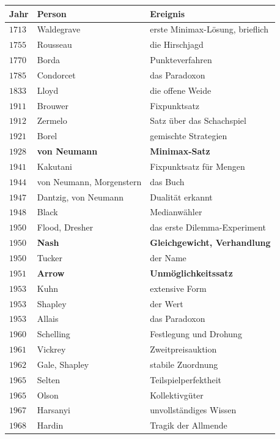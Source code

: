 \begin{merksatz}
\begin{center}
{\small
\renewcommand{\arraystretch}{1.34}
\begin{tabular}{@{}P{1.4cm}P{2.8cm}P{4.0cm}@{}}
\toprule
\textbf{Jahr} & \textbf{Person} & \textbf{Ereignis}\\
\midrule
$1713$ & Waldegrave & erste Minimax-Lösung, brieflich\\
$1755$ & Rousseau & die Hirschjagd\\
$1770$ & Borda & Punkteverfahren\\
$1785$ & Condorcet & das Paradoxon\\
$1833$ & Lloyd & die offene Weide\\
$1911$ & Brouwer & Fixpunktsatz\\
$1912$ & Zermelo & Satz über das Schachspiel\\
$1921$ & Borel & gemischte Strategien\\
$1928$ & \textbf{von Neumann} & \textbf{Minimax-Satz}\\
$1941$ & Kakutani & Fixpunktsatz für Mengen\\
$1944$ & von Neumann, Morgenstern & das Buch\\
$1947$ & Dantzig, von Neumann & Dualität erkannt\\
$1948$ & Black & Medianwähler\\
$1950$ & Flood, Dresher & das erste Dilemma-Experiment\\
$1950$ & \textbf{Nash} & \textbf{Gleichgewicht, Verhandlung}\\
$1950$ & Tucker & der Name\\
$1951$ & \textbf{Arrow} & \textbf{Unmöglichkeitssatz}\\
$1953$ & Kuhn & extensive Form\\
$1953$ & Shapley & der Wert\\
$1953$ & Allais & das Paradoxon\\
$1960$ & Schelling & Festlegung und Drohung\\
$1961$ & Vickrey & Zweitpreisauktion\\
$1962$ & Gale, Shapley & stabile Zuordnung\\
$1965$ & Selten & Teilspielperfektheit\\
$1965$ & Olson & Kollektivgüter\\
$1967$ & Harsanyi & unvollständiges Wissen\\
$1968$ & Hardin & Tragik der Allmende\\

\end{tabular}}
\end{center}
\end{merksatz}
